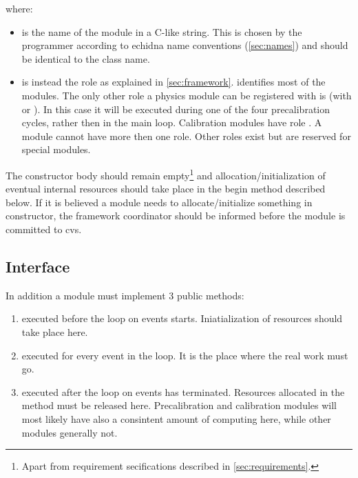 \small{}

where:
\begin{itemize}
\item {} is the name of the module in a C-like string. 
This is chosen by the programmer according to echidna name conventions (\ref{sec:names}) and should be identical to the class name.
\item {} is instead the role as explained in \ref{sec:framework}.
 identifies most of the modules. The only other role a physics module can be registered with is 
(with  or ). In this case it will be executed during one of the four precalibration cycles, rather then in the main loop. 
Calibration modules have role . A module cannot have more then one role. Other roles exist but are reserved for special modules.
\end{itemize}
The constructor body should remain empty\footnote{Apart from requirement secifications described in \ref{sec:requirements}.} 
and allocation/initialization of eventual internal resources should take place in the begin method described below.
If it is believed a module needs to allocate/initialize something in constructor, the framework coordinator should be informed before the module is committed to cvs.


\subsection{Interface}

In addition a module must implement 3 public methods:
\begin{enumerate}
\item {}

executed before the loop on events starts. Iniatialization of resources should take place here.
\item {}

executed for every event in the loop. It is the place where the real work must go.

\item {}

executed after the loop on events has terminated. Resources allocated in the  method must be released here.
Precalibration and calibration modules will most likely have also a consintent amount of computing here, while other modules generally not.
\end{enumerate}

